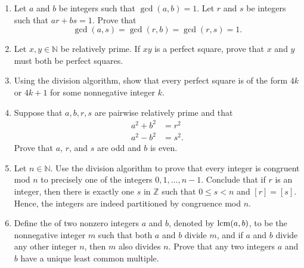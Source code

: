 {\begin{enumerate}
\begin{enumerate}
 \item
Prove that $f_n = [(1 + \sqrt{5}\, )^n - (1 - \sqrt{5}\, )^n]/ 2^n \sqrt{5}$.
 
 \item
Show that $\lim_{n \rightarrow \infty} f_n / f_{n + 1} = (\sqrt{5} - 1)/2$. 
 
 \item
Prove that $f_n$ and $f_{n + 1}$ are relatively prime.
 
\end{enumerate}

\item
Let $a$ and $b$ be integers such that $\gcd(a,b) = 1$.  Let $r$ and $s$ be integers such that $ar + bs =1$.  Prove that 
\[
\gcd(a,s) = \gcd(r,b) = \gcd(r,s) =  1.
\]

\item
Let $x, y \in {\mathbb N}$ be relatively prime.  If $xy$ is a perfect square, prove that $x$ and $y$ must both be perfect squares.

\item
Using the division algorithm, show that every perfect square is of the form $4k$ or $4k + 1$ for some nonnegative integer $k$.

\item
Suppose that $a, b, r, s$ are pairwise relatively prime and that
\begin{align*}
a^2 + b^2 & = r^2 \\
a^2 - b^2 & = s^2.
\end{align*}
Prove that $a$, $r$, and $s$ are odd and $b$ is even.

 
\item
Let $n \in {\mathbb N}$.  Use the division algorithm to prove that every integer is congruent mod $n$ to precisely one of the integers $0, 1, \ldots, n-1$.  Conclude that if $r$ is an integer, then there is exactly one $s$ in ${\mathbb Z}$ such that $0 \leq s < n$ and $[r] = [s]$.   Hence, the integers are indeed partitioned by congruence mod $n$. 

\item
Define the  of two nonzero integers $a$ and $b$, denoted by $\operatorname{lcm}(a,b)$\label{leastcm}, to be the nonnegative integer $m$ such that both $a$ and $b$ divide $m$, and if $a$ and $b$  divide any other integer $n$, then $m$ also divides $n$.  Prove that any two integers $a$ and $b$ have a unique least common multiple. 


\end{enumerate}}
